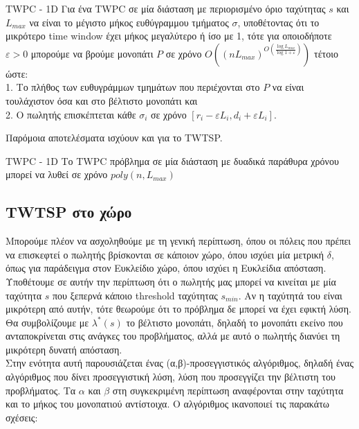 \documentclass[oneside,12pt]{book}
\theoremstyle{definition}
\begin{document}
\begin{mytheorem}{TWPC - 1D}{}
	Για ένα TWPC σε μία διάσταση με περιορισμένο όριο ταχύτητας \(s\) και \(L_{max}\) να είναι το μέγιστο μήκος ευθύγραμμου τμήματος \(σ\), υποθέτοντας ότι το μικρότερο time window έχει μήκος μεγαλύτερο ή ίσο με 1, τότε για οποιοδήποτε \(ε > 0\) μπορούμε να βρούμε μονοπάτι \(P\) σε χρόνο \(Ο((nL_{max})^{O(\frac{\log L_{max}}{\log 1 + ε})})\) τέτοιο ώστε: \\
	1. Το πλήθος των ευθυγράμμων τμημάτων που περιέχονται στο \(P\) να είναι τουλάχιστον όσα και στο βέλτιστο μονοπάτι και \\
	2. Ο πωλητής επισκέπτεται κάθε \(σ_i\) σε χρόνο \([r_i - εL_i, d_i + εL_i]\).
\end{mytheorem}

Παρόμοια αποτελέσματα ισχύουν και για το TWTSP. \\

\begin{mylemma}{TWPC - 1D}{}
	Το TWPC πρόβλημα σε μία διάσταση με δυαδικά παράθυρα χρόνου μπορεί να λυθεί σε χρόνο \(poly(n,L_{max})\)
\end{mylemma}

\subsection{TWTSP στο χώρο}

Μπορούμε πλέον να ασχοληθούμε με τη γενική περίπτωση, όπου οι πόλεις που πρέπει να επισκεφτεί ο πωλητής βρίσκονται σε κάποιον χώρο, όπου ισχύει μία μετρική \(δ\), όπως για παράδειγμα στον Ευκλείδιο χώρο, όπου ισχύει η Ευκλείδια απόσταση. \\

Υποθέτουμε σε αυτήν την περίπτωση ότι ο πωλητής μας μπορεί να κινείται με μία ταχύτητα \(s\) που ξεπερνά κάποιο threshold ταχύτητας \(s_{min}\). Αν η ταχύτητά του είναι μικρότερη από αυτήν, τότε θεωρούμε ότι το πρόβλημα δε μπορεί να έχει εφικτή λύση. \\

Θα συμβολίζουμε με \(λ^{*}(s)\) το βέλτιστο μονοπάτι, δηλαδή το μονοπάτι εκείνο που ανταποκρίνεται στις ανάγκες του προβλήματος, αλλά με αυτό ο πωλητής διανύει τη μικρότερη δυνατή απόσταση. \\

Στην ενότητα αυτή παρουσιάζεται ένας (α,β)-προσεγγιστικός αλγόριθμος, δηλαδή ένας αλγόριθμος που δίνει προσεγγιστική λύση, λύση που προσεγγίζει την βέλτιστη του προβλήματος. Τα \(α\) και \(β\) στη συγκεκριμένη περίπτωση αναφέρονται στην ταχύτητα και το μήκος του μονοπατιού αντίστοιχα. Ο αλγόριθμος ικανοποιεί τις παρακάτω σχέσεις:
\end{document}
